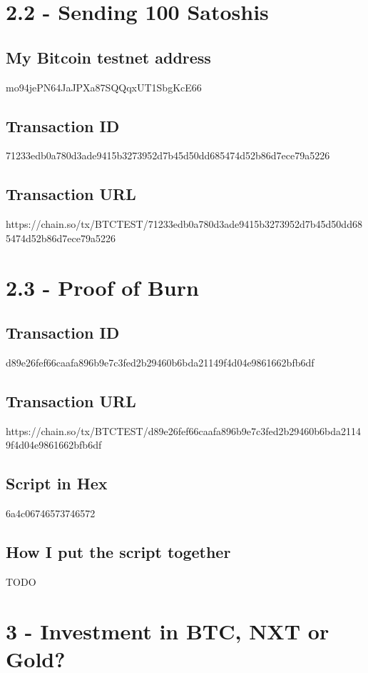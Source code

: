 \documentclass[11pt]{article}
\begin{document}
	\newpage
	
	
	\section*{2.2 - Sending 100 Satoshis}
	\subsection*{My Bitcoin testnet address}
	mo94jePN64JaJPXa87SQQqxUT1SbgKcE66
	
	\subsection*{Transaction ID}
	71233edb0a780d3ade9415b3273952d7b45d50dd685474d52b86d7ece79a5226
	
	\subsection*{Transaction URL} https://chain.so/tx/BTCTEST/71233edb0a780d3ade9415b3273952d7b45d50dd685474d52b86d7ece79a5226
	
	\newpage
	
	
	\section*{2.3 - Proof of Burn}
	\subsection*{Transaction ID}
	d89e26fef66caafa896b9e7c3fed2b29460b6bda21149f4d04e9861662bfb6df
	
	\subsection*{Transaction URL}
	https://chain.so/tx/BTCTEST/d89e26fef66caafa896b9e7c3fed2b29460b6bda21149f4d04e9861662bfb6df
	
	\subsection*{Script in Hex}
	6a4c06746573746572
	
	\subsection*{How I put the script together}
	TODO
	
	\newpage
	
	
	\section*{3 - Investment in BTC, NXT or Gold?}
	
	
	
	
	
	
\end{document}

